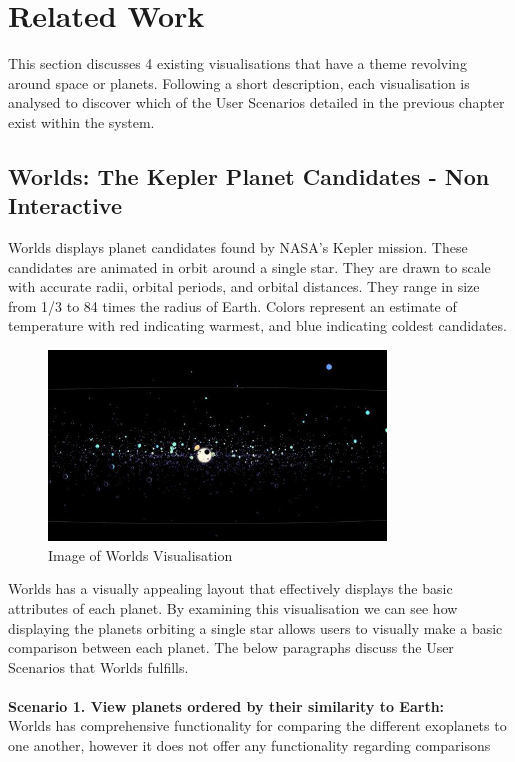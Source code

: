 \chapter{Related Work} 
This section discusses 4 existing visualisations that have a theme revolving
around
space or planets. Following a short description, each visualisation is analysed
to
discover which of the User Scenarios detailed in the previous chapter exist
within the
system.

\section{Worlds: The Kepler Planet Candidates - Non Interactive}
Worlds \cite{worlds} displays planet candidates found by NASA's Kepler
mission. These candidates are animated in orbit around a single star. They are
drawn to scale with accurate radii, orbital periods, and orbital distances. They
range in size from 1/3 to 84 times the radius of Earth. Colors represent an
estimate of temperature with red indicating warmest, and blue indicating coldest
candidates. 
\begin{figure}[H]
  \centering
      \includegraphics[width=0.8\textwidth]{images/worlds.jpg}
  \caption{Image of Worlds Visualisation}
\end{figure}
Worlds has a visually appealing layout that effectively displays the basic
attributes of each planet. By examining this visualisation we can see how
displaying the planets orbiting a single star allows users to visually make a
basic comparison between each planet. The below paragraphs discuss the User
Scenarios that Worlds fulfills.
 \\\\
{\bf Scenario 1. View planets ordered by their similarity to Earth:\\}
Worlds has comprehensive functionality for comparing the different exoplanets to
one another, however it does not offer any functionality regarding comparisons
